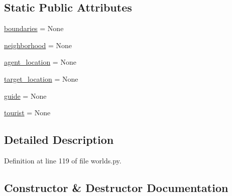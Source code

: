 \subsection*{Static Public Attributes}
\begin{DoxyCompactItemize}
\item 
\hyperlink{classparlai_1_1tasks_1_1talkthewalk_1_1worlds_1_1SimulateWorld_a4af404e8cd0ba091737ac83c212313db}{boundaries} = None
\item 
\hyperlink{classparlai_1_1tasks_1_1talkthewalk_1_1worlds_1_1SimulateWorld_abba0187065d0301544aeb3938776d567}{neighborhood} = None
\item 
\hyperlink{classparlai_1_1tasks_1_1talkthewalk_1_1worlds_1_1SimulateWorld_adc810464032ecbbcab43ae1469073bcc}{agent\+\_\+location} = None
\item 
\hyperlink{classparlai_1_1tasks_1_1talkthewalk_1_1worlds_1_1SimulateWorld_a0b116dd9980e163ec7a0565996677e97}{target\+\_\+location} = None
\item 
\hyperlink{classparlai_1_1tasks_1_1talkthewalk_1_1worlds_1_1SimulateWorld_af395c9415b1b93e19382a4fda023cf37}{guide} = None
\item 
\hyperlink{classparlai_1_1tasks_1_1talkthewalk_1_1worlds_1_1SimulateWorld_abfa37e958248323fcffa9455487dca0c}{tourist} = None
\end{DoxyCompactItemize}


\subsection{Detailed Description}


Definition at line 119 of file worlds.\+py.



\subsection{Constructor \& Destructor Documentation}
\mbox{\label{classparlai_1_1tasks_1_1talkthewalk_1_1worlds_1_1SimulateWorld_ab9073698c5054aaa0a605c946275cce4}} 
